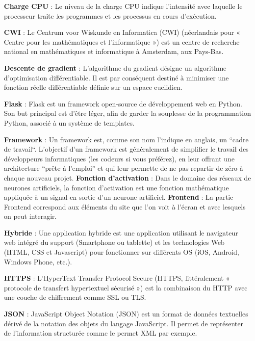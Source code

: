 \documentclass[oneside,a4paper,13pt]{article}
\begin{document}
\medbreak
\textbf{Charge CPU} : Le niveau de la charge CPU indique l'intensité avec laquelle le processeur traite les programmes et les processus en cours d'exécution.

\textbf{CWI} : Le Centrum voor Wiskunde en Informatica (CWI) (néerlandais pour « Centre pour les mathématiques et l'informatique ») est un centre de recherche national en mathématiques et informatique à Amsterdam, aux Pays-Bas.

\medbreak
\textbf{Descente de gradient} : L'algorithme du gradient désigne un algorithme d'optimisation différentiable. Il est par conséquent destiné à minimiser une fonction réelle différentiable définie sur un espace euclidien.
\medbreak

\medbreak
\textbf{Flask} : Flask est un framework open-source de développement web en Python. Son but principal est d'être léger, afin de garder la souplesse de la programmation Python, associé à un système de templates.

\textbf{Framework} : Un framework est, comme son nom l’indique en anglais, un “cadre de travail“. L’objectif d’un framework est généralement de simplifier le travail des développeurs informatiques (les codeurs si vous préférez), en leur offrant une architecture “prête à l’emploi” et qui leur permette de ne pas repartir de zéro à chaque nouveau projet.
\medbreak
\textbf{Fonction d'activation} : Dans le domaine des réseaux de neurones artificiels, la fonction d'activation est une fonction mathématique appliquée à un signal en sortie d'un neurone artificiel.
\medbreak
\textbf{Frontend} : La partie Frontend correspond aux éléments du site que l'on voit à l'écran et avec lesquels on peut interagir. 

\medbreak
\textbf{Hybride} : Une application hybride est une application utilisant le navigateur web intégré du support (Smartphone ou tablette) et les technologies Web (HTML, CSS et Javascript) pour fonctionner sur différents OS (iOS, Android, Windows Phone, etc.).

\medbreak
\textbf{HTTPS} : L'HyperText Transfer Protocol Secure (HTTPS, littéralement « protocole de transfert hypertextuel sécurisé ») est la combinaison du HTTP avec une couche de chiffrement comme SSL ou TLS.

\medbreak
\textbf{JSON} : JavaScript Object Notation (JSON) est un format de données textuelles dérivé de la notation des objets du langage JavaScript. Il permet de représenter de l’information structurée comme le permet XML par exemple.
\end{document}
